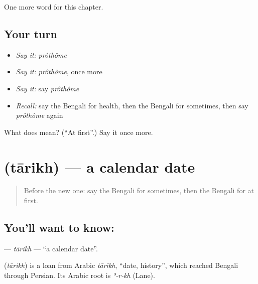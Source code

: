 \begin{grammarlens}[title={What you've built}]
One more word for this chapter.
\end{grammarlens}

\subsection*{Your turn}
\begin{itemize}
\raggedright
  \item \emph{Say it:} \emph{prôthôme}
  \item \emph{Say it:} \emph{prôthôme}, once more
  \item \emph{Say it:} say \emph{prôthôme}
  \item \emph{Recall:} say the Bengali for health, then the Bengali for sometimes, then say \emph{prôthôme} again
\end{itemize}

\begin{tcolorbox}[breakable,colback=teal!4,colframe=teal!35!black,title={Before you move on}]
What does  mean? (\textquotedblleft{}At first\textquotedblright{}.) Say it once more.
\end{tcolorbox}
\section[\texorpdfstring{\bn{তারিখ} (tārikh)}{তারিখ (tārikh)}]{ (tārikh) — a calendar date}

\label{lesson:BN-C156-tarikh}



\begin{quote}
Before the new one: say the Bengali for sometimes, then the Bengali for at first.
\end{quote}

\subsection*{You'll want to know: }
\textbf{} — \emph{tārikh} — \textquotedblleft{}a calendar date\textquotedblright{}.

\begin{cousinweb}
\textbf{} (\emph{tārikh}) is a loan from Arabic \emph{tārīkh}, \textquotedblleft{}date, history\textquotedblright{}, which reached Bengali through Persian. Its Arabic root is \emph{ʾ-r-kh} (Lane).
\end{cousinweb}

